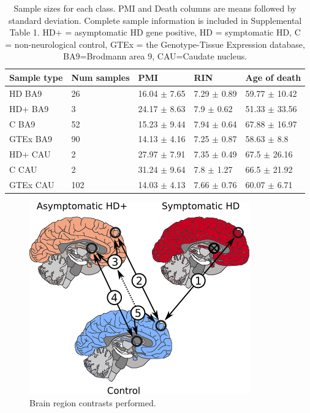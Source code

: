 \documentclass[fleqn,10pt,table]{wlscirep}
\begin{document}
\begin{table}[ht]
\centering
{}
\begin{tabular}{|l|l|l|l|l|} \hline
Sample type & Num samples & PMI & RIN & Age of death \\ \hline
HD BA9 & 26 & 16.04 $\pm$ 7.65 & 7.29 $\pm$ 0.89 & 59.77 $\pm$ 10.42 \\ \hline
HD+ BA9 & 3 & 24.17 $\pm$ 8.63 & 7.9 $\pm$ 0.62 & 51.33 $\pm$ 33.56 \\ \hline
C BA9 & 52 & 15.23 $\pm$ 9.44 & 7.94 $\pm$ 0.64 & 67.88 $\pm$ 16.97 \\ \hline
GTEx BA9 & 90 & 14.13 $\pm$ 4.16 & 7.25 $\pm$ 0.87 & 58.63 $\pm$ 8.8 \\ \hline
HD+ CAU & 2 & 27.97 $\pm$ 7.91 & 7.35 $\pm$ 0.49 & 67.5 $\pm$ 26.16 \\ \hline
C CAU & 2 & 31.24 $\pm$ 9.64 & 7.8 $\pm$ 1.27 & 66.5 $\pm$ 21.92 \\ \hline
GTEx CAU & 102 & 14.03 $\pm$ 4.13 & 7.66 $\pm$ 0.76 & 60.07 $\pm$ 6.71 \\ \hline
\end{tabular}
\caption{Sample sizes for each class.
PMI and Death columns are means followed by standard deviation.
Complete sample information is included in Supplemental Table 1.
HD+ = asymptomatic HD gene positive, HD = symptomatic HD, C = non-neurological control, GTEx = the Genotype-Tissue Expression database, BA9=Brodmann area 9, CAU=Caudate nucleus.
\label{tab:samples}}
\end{table}

\begin{figure}[ht]
\centering
\includegraphics[width=0.5\linewidth]{asymp_figure_1.png}
\caption{Brain region contrasts performed. \label{fig:contrasts}}
\end{figure}
\end{document}
